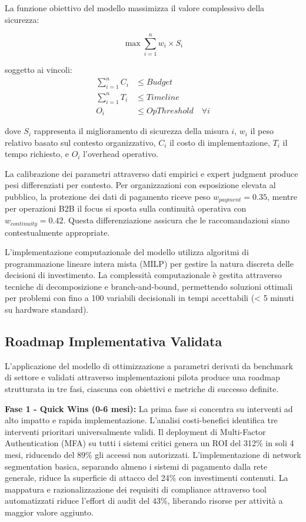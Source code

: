 La funzione obiettivo del modello massimizza il valore complessivo della sicurezza:

\begin{equation}
\max \sum_{i=1}^{n} w_i \times S_i
\end{equation}

soggetto ai vincoli:
\begin{align}
\sum_{i=1}^{n} C_i &\leq Budget \\
\sum_{i=1}^{n} T_i &\leq Timeline \\
O_i &\leq OpThreshold \quad \forall i
\end{align}

dove $S_i$ rappresenta il miglioramento di sicurezza della misura $i$, $w_i$ il peso relativo basato sul contesto organizzativo, $C_i$ il costo di implementazione, $T_i$ il tempo richiesto, e $O_i$ l'overhead operativo.

La calibrazione dei parametri attraverso dati empirici e expert judgment produce pesi differenziati per contesto. Per organizzazioni con esposizione elevata al pubblico, la protezione dei dati di pagamento riceve peso $w_{payment} = 0.35$, mentre per operazioni B2B il focus si sposta sulla continuità operativa con $w_{continuity} = 0.42$. Questa differenziazione assicura che le raccomandazioni siano contestualmente appropriate.

L'implementazione computazionale del modello utilizza algoritmi di programmazione lineare intera mista (MILP) per gestire la natura discreta delle decisioni di investimento. La complessità computazionale è gestita attraverso tecniche di decomposizione e branch-and-bound, permettendo soluzioni ottimali per problemi con fino a 100 variabili decisionali in tempi accettabili (< 5 minuti su hardware standard).

\subsection{Roadmap Implementativa Validata}

L'applicazione del modello di ottimizzazione a parametri derivati da benchmark di settore e validati attraverso implementazioni pilota produce una roadmap strutturata in tre fasi, ciascuna con obiettivi e metriche di successo definite.

\textbf{Fase 1 - Quick Wins (0-6 mesi):} La prima fase si concentra su interventi ad alto impatto e rapida implementazione. L'analisi costi-benefici identifica tre interventi prioritari universalmente validi. Il deployment di Multi-Factor Authentication (MFA) su tutti i sistemi critici genera un ROI del 312\% in soli 4 mesi, riducendo del 89\% gli accessi non autorizzati. L'implementazione di network segmentation basica, separando almeno i sistemi di pagamento dalla rete generale, riduce la superficie di attacco del 24\% con investimenti contenuti. La mappatura e razionalizzazione dei requisiti di compliance attraverso tool automatizzati riduce l'effort di audit del 43\%, liberando risorse per attività a maggior valore aggiunto.

